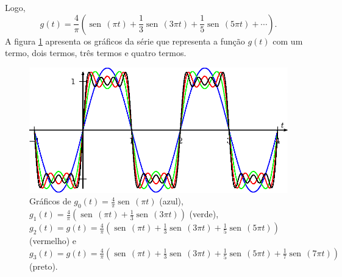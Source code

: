 \documentclass[a4paper,10pt]{book}
\newcommand{\sen}{\operatorname{sen}\,}
\begin{document}
    Logo,
 \begin{equation}
 g(t)=\frac{4}{\pi}\left(\sen(\pi t)+\frac{1}{3}\sen(3\pi t)+\frac{1}{5}\sen(5\pi t)+\cdots\right).
 \end{equation}
 A figura \ref{fig_conv_quadrangular} apresenta os gráficos da série que representa a função $g(t)$ com um termo, dois termos, três termos e quatro termos.
 \begin{figure}[!ht]
 \begin{center}
 \includegraphics{figs/cap_series_figura_4}\end{center}
 \caption{\label{fig_conv_quadrangular}Gráficos de $g_0(t)=\frac{4}{\pi}\sen(\pi t)$ (azul), $g_1(t)=\frac{4}{\pi}\left(\sen(\pi t)+\frac{1}{3}\sen(3\pi t)\right)$ (verde), $g_2(t)=g(t)=\frac{4}{\pi}\left(\sen(\pi t)+\frac{1}{3}\sen(3\pi t)+\frac{1}{5}\sen(5\pi t)\right)$ (vermelho) e $g_3(t)=g(t)=\frac{4}{\pi}\left(\sen(\pi t)+\frac{1}{3}\sen(3\pi t)+\frac{1}{5}\sen(5\pi t)+\frac{1}{7}\sen(7\pi t)\right)$ (preto).}
\end{figure}
\end{document}
